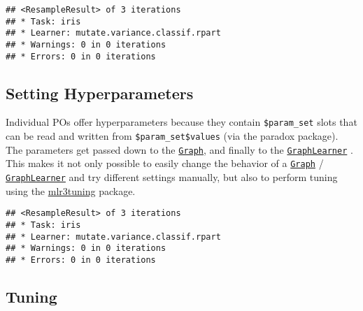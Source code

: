 \documentclass[
]{scrbook}
\newenvironment{Shaded}{\begin{snugshade}}{\end{snugshade}}
\newcommand{\AttributeTok}[1]{\textcolor[rgb]{0.77,0.63,0.00}{#1}}
\newcommand{\DecValTok}[1]{\textcolor[rgb]{0.00,0.00,0.81}{#1}}
\newcommand{\FloatTok}[1]{\textcolor[rgb]{0.00,0.00,0.81}{#1}}
\newcommand{\FunctionTok}[1]{\textcolor[rgb]{0.00,0.00,0.00}{#1}}
\newcommand{\NormalTok}[1]{#1}
\newcommand{\OtherTok}[1]{\textcolor[rgb]{0.56,0.35,0.01}{#1}}
\newcommand{\SpecialCharTok}[1]{\textcolor[rgb]{0.00,0.00,0.00}{#1}}
\newcommand{\StringTok}[1]{\textcolor[rgb]{0.31,0.60,0.02}{#1}}
\renewenvironment{Shaded} {\begin{snugshade}\small} {\end{snugshade}}
\begin{document}
\begin{verbatim}
## <ResampleResult> of 3 iterations
## * Task: iris
## * Learner: mutate.variance.classif.rpart
## * Warnings: 0 in 0 iterations
## * Errors: 0 in 0 iterations
\end{verbatim}

\hypertarget{pipe-hyperpars}{%
\subsection{Setting Hyperparameters}\label{pipe-hyperpars}}

Individual POs offer hyperparameters because they contain \texttt{\$param\_set} slots that can be read and written from \texttt{\$param\_set\$values} (via the paradox package).
The parameters get passed down to the \href{https://mlr3pipelines.mlr-org.com/reference/Graph.html}{\texttt{Graph}}, and finally to the \href{https://mlr3pipelines.mlr-org.com/reference/mlr_learners_graph.html}{\texttt{GraphLearner}} .
This makes it not only possible to easily change the behavior of a \href{https://mlr3pipelines.mlr-org.com/reference/Graph.html}{\texttt{Graph}} / \href{https://mlr3pipelines.mlr-org.com/reference/mlr_learners_graph.html}{\texttt{GraphLearner}} and try different settings manually, but also to perform tuning using the \href{https://mlr3tuning.mlr-org.com}{mlr3tuning} package.

\begin{Shaded}
\end{Shaded}

\begin{verbatim}
## <ResampleResult> of 3 iterations
## * Task: iris
## * Learner: mutate.variance.classif.rpart
## * Warnings: 0 in 0 iterations
## * Errors: 0 in 0 iterations
\end{verbatim}

\hypertarget{pipe-tuning}{%
\subsection{Tuning}\label{pipe-tuning}}
\end{document}
